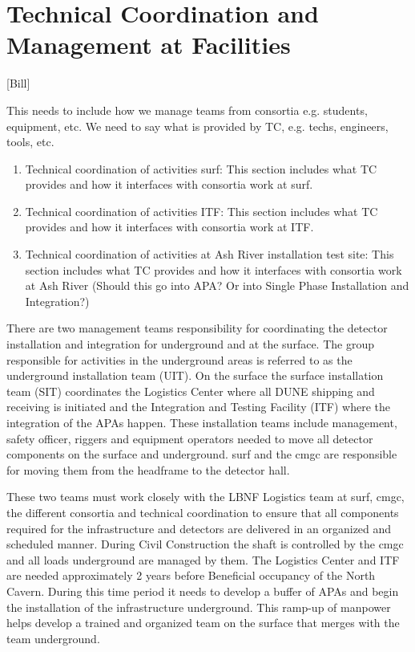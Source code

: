 \chapter{Technical Coordination and Management at Facilities}
\label{vl:tc-facility_mgmt}

[Bill]

This needs to include how we manage teams from consortia
e.g. students, equipment, etc. We need to say what is provided by TC,
e.g. techs, engineers, tools, etc.
\begin{enumerate}
 \item Technical coordination of activities {surf}: This section
   includes what TC provides and how it interfaces with consortia work
   at {surf}.
 \item Technical coordination of activities ITF: This section includes
   what TC provides and how it interfaces with consortia work at ITF.
 \item Technical coordination of activities at Ash River installation
   test site: This section includes what TC provides and how it
   interfaces with consortia work at Ash River (Should this go into
   APA? Or into Single Phase Installation and Integration?)
\end{enumerate}



There are two management teams responsibility for coordinating the
detector installation and integration for underground and at the
surface. The group responsible for activities in the underground areas
is referred to as the underground installation team (UIT).  On the
surface the surface installation team (SIT) coordinates the Logistics
Center where all DUNE shipping and receiving is initiated and the
Integration and Testing Facility (ITF) where the integration of the
APAs happen.  These installation teams include management, safety
officer, riggers and equipment operators needed to move all detector
components on the surface and underground. {surf} and the {cmgc} are
responsible for moving them from the headframe to the detector hall.

These two teams must work closely with the LBNF Logistics team at
{surf}, {cmgc}, the different consortia and technical coordination to
ensure that all components required for the infrastructure and
detectors are delivered in an organized and scheduled manner. During
Civil Construction the shaft is controlled by the {cmgc} and all loads
underground are managed by them.  The Logistics Center and ITF are
needed approximately 2 years before Beneficial occupancy of the North
Cavern.  During this time period it needs to develop a buffer of APAs
and begin the installation of the infrastructure underground. This
ramp-up of manpower helps develop a trained and organized team on the
surface that merges with the team underground.


